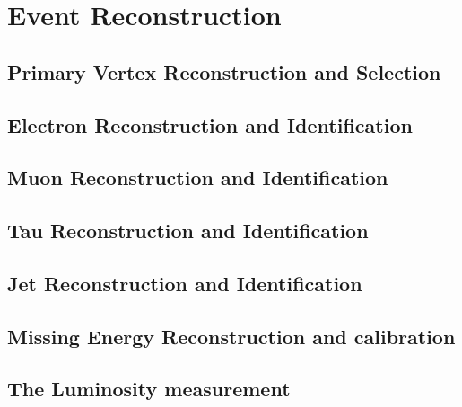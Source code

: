 \chapter{Event Reconstruction}

\section{Primary Vertex Reconstruction and Selection}

\section{Electron Reconstruction and Identification}

\section{Muon Reconstruction and Identification}

\section{Tau Reconstruction and Identification}

\section{Jet Reconstruction and Identification}

\section{Missing Energy Reconstruction and calibration}
    
\section{The Luminosity measurement }

